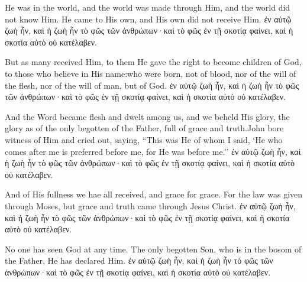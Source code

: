 \newpage

\begin{paracol}{2}
    He was in the world, and the world was made through Him, and the world did not know Him.
    He came to His own, and His own did not receive Him.
\switchcolumn
 ἐν αὐτῷ ζωὴ ἦν, καὶ ἡ ζωὴ ἦν τὸ φῶς τῶν ἀνθρώπων·καὶ τὸ φῶς ἐν τῇ σκοτίᾳ φαίνει, καὶ ἡ σκοτία αὐτὸ οὐ κατέλαβεν.
\end{paracol}

\newpage

\begin{paracol}{2}
But as many received Him, to them He gave the right to become children of God, to those who believe in His name:who were born, not of blood, nor of the will of the flesh, nor of the will of man, but of God.
\switchcolumn
 ἐν αὐτῷ ζωὴ ἦν, καὶ ἡ ζωὴ ἦν τὸ φῶς τῶν ἀνθρώπων·καὶ τὸ φῶς ἐν τῇ σκοτίᾳ φαίνει, καὶ ἡ σκοτία αὐτὸ οὐ κατέλαβεν.
\end{paracol}

\newpage

\begin{paracol}{2}
And the Word became flesh and dwelt among us, and we beheld His glory, the glory as of the only begotten of the Father, full of grace and truth.John bore witness of Him and cried out, saying, ``This was He of whom I said, `He who comes after me is preferred before me, for He was before me.''
\switchcolumn
 ἐν αὐτῷ ζωὴ ἦν, καὶ ἡ ζωὴ ἦν τὸ φῶς τῶν ἀνθρώπων·καὶ τὸ φῶς ἐν τῇ σκοτίᾳ φαίνει, καὶ ἡ σκοτία αὐτὸ οὐ κατέλαβεν.
\end{paracol}

\newpage

\begin{paracol}{2}
And of His fullness we hae all received, and grace for grace. For the law was given through Moses, but grace and truth came through Jesus Christ.
\switchcolumn
 ἐν αὐτῷ ζωὴ ἦν, καὶ ἡ ζωὴ ἦν τὸ φῶς τῶν ἀνθρώπων·καὶ τὸ φῶς ἐν τῇ σκοτίᾳ φαίνει, καὶ ἡ σκοτία αὐτὸ οὐ κατέλαβεν.
\end{paracol}

\newpage

\begin{paracol}{2}
No one has seen God at any time. The only begotten Son, who is in the bosom of the Father, He has declared Him.
\switchcolumn
 ἐν αὐτῷ ζωὴ ἦν, καὶ ἡ ζωὴ ἦν τὸ φῶς τῶν ἀνθρώπων·καὶ τὸ φῶς ἐν τῇ σκοτίᾳ φαίνει, καὶ ἡ σκοτία αὐτὸ οὐ κατέλαβεν.
\end{paracol}
